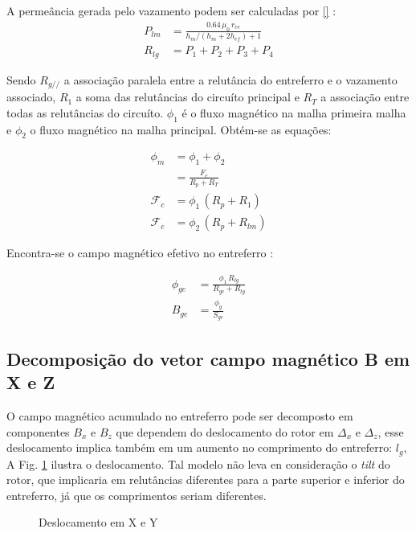 A permeância gerada pelo vazamento podem ser calculadas por \ref{}  : 
\begin{align}
P_{lm} &= \frac{0.64 \,  \mu_0 \,r_{ee}}{h_m/(h_m+2h_{ef})+1} \\
R_{lg} &= P_1 + P_2 + P_3 + P_4	
\end{align} 

Sendo $R_{g//}$ a associação paralela entre a relutância do entreferro e o vazamento associado, $R_1$ a soma das relutâncias do circuíto principal e $R_T$ a associação entre todas as relutâncias do circuíto. $\phi_1$ é o fluxo magnético na malha primeira malha e $\phi_2$ o fluxo magnético na malha principal. Obtém-se as equações:

\begin{align}
\phi_m &= \phi_1 + \phi_2 \\
&= \frac{F_c}{R_p + R_T} \\
\mathcal{F}_c	 &= \phi_1 \, (R_p + R_1) \\
\mathcal{F}_c    &= \phi_2 \, (R_p + R_{lm})
\end{align}

Encontra-se o campo magnético efetivo no entreferro :

\begin{align}
\phi_{ge} &= \frac{\phi_1 \, R_{lg}}{R_{ge}+R_{lg}} \\
B_{ge} &= \frac{\phi_g}{S_{ge}}
\end{align}


\subsection{Decomposição do vetor campo magnético B em X e Z} \label{SubSec:CampoX/Y}

O campo magnético acumulado no entreferro pode ser decomposto em componentes $B_x$ e $B_z$ que dependem do deslocamento do rotor em $\Delta_x$ e $\Delta_z$, esse deslocamento implica também em um aumento no comprimento do entreferro: $l_g$, A Fig. \ref{Fig:modelo:passivo:DxDz} ilustra o deslocamento. Tal modelo não leva en consideração o \textit{tilt} do rotor, que implicaria em relutâncias diferentes para a parte superior e inferior do entreferro, já que os comprimentos seriam diferentes. 

\begin{figure}[!ht]
	\centering
	\def\svgwidth{0.6\columnwidth}
	
	\caption{Deslocamento em X e Y}
	\label{Fig:modelo:passivo:DxDz}
\end{figure}

